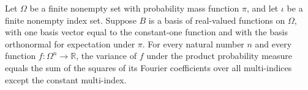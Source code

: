 \begin{theorem}
\label{FABL.FiniteFourierBasis.variance_eq_sum_sq_fourierCoeff}
\leanok
{}
Let $\Omega$ be a finite nonempty set with probability mass function $\pi$, and let
$\iota$ be a finite nonempty index set. Suppose $B$ is a basis of real-valued functions
on $\Omega$, with one basis vector equal to the constant-one function and with the basis
orthonormal for expectation under $\pi$. For every natural number $n$ and every function
$f:\Omega^n\to\mathbb{R}$, the variance of $f$ under the product probability measure
equals the sum of the squares of its Fourier coefficients over all multi-indices except
the constant multi-index.
\end{theorem}

